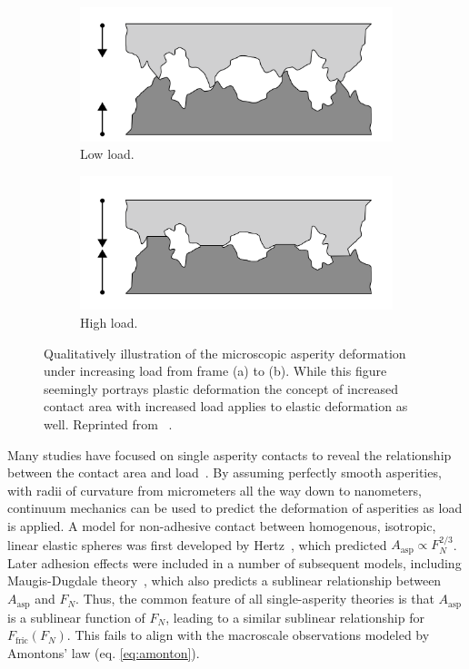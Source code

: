 \begin{figure}[H]
  \centering
  \begin{subfigure}[b]{0.49\textwidth}
      \centering
      \includegraphics[width=\textwidth]{figures/theory/asperities_top.png}
      \caption{Low load.}
      \label{fig:asp_left}
  \end{subfigure}
  \hfill
  \begin{subfigure}[b]{0.49\textwidth}
      \centering
      \includegraphics[width=\textwidth]{figures/theory/asperities_bottom.png}
      \caption{High load.}
      \label{fig:asp_right}
  \end{subfigure}
  \hfill
     \caption{Qualitatively illustration of the microscopic asperity deformation
     under increasing load from frame (a) to (b). While this figure seemingly portrays plastic deformation the concept of increased contact area with increased load applies to elastic deformation as well. Reprinted from ~\cite{wiki:asperities}.}
     \label{fig:asperity_contact}
\end{figure}

Many studies have focused on single asperity contacts to reveal the relationship
between the contact area and load~\cite{Szlufarska_2008, PhysRevLett.56.930,
perry_scanning_2004}. By assuming perfectly smooth asperities, with radii of
curvature from micrometers all the way down to nanometers, continuum mechanics
can be used to predict the deformation of asperities as load is applied. A model
for non-adhesive contact between homogenous, isotropic, linear elastic spheres
was first developed by Hertz~\cite{HertzOnTC}, which predicted $A_{\text{asp}}
\propto F_N^{2/3}$. Later adhesion effects were included in a number of
subsequent models, including Maugis-Dugdale theory~\cite{MAUGIS1992243}, which
also predicts a sublinear relationship between $A_{\text{asp}}$ and $F_N$. Thus,
the common feature of all single-asperity theories is that $A_{\text{asp}}$ is a
sublinear function of $F_N$, leading to a similar sublinear relationship for
$F_\text{fric}(F_N)$. This fails to align with the macroscale observations
modeled by Amontons’ law (eq. \eqref{eq:amonton}).

